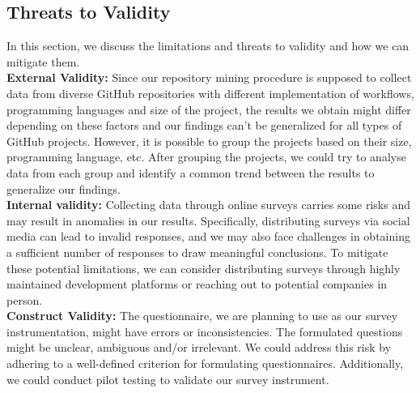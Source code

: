\documentclass[conference]{IEEEtran}
\begin{document}
    \subsection{Threats to Validity}
        In this section, we discuss the limitations and threats to
        validity and how we can mitigate them.\\

        \textbf{External Validity:} Since our repository mining procedure is supposed to collect data from diverse GitHub repositories with different implementation of workflows, programming languages and size of the project, the results we obtain might differ depending on these factors and our findings can’t be generalized for all types of GitHub projects. However, it is possible to group the projects based on their size, programming language, etc. After grouping the projects, we could try to analyse data from each group and identify a common trend between the results to generalize our findings.\\

        \textbf{Internal validity:} Collecting data through online surveys carries some risks and may result in anomalies in our results. Specifically, distributing surveys via social media can lead to invalid responses, and we may also face challenges in obtaining a sufficient number of responses to draw meaningful conclusions. To mitigate these potential limitations, we can consider distributing surveys through highly maintained development platforms or reaching out to potential companies in person. \\

	\textbf{Construct Validity:} The questionnaire, we are planning to use as our survey instrumentation, might have errors or inconsistencies. The formulated questions might be unclear, ambiguous and/or irrelevant. We could address this risk by adhering to a well-defined criterion for formulating questionnaires. Additionally, we could conduct pilot testing to validate our survey instrument.






\vspace{12pt}
\end{document}
